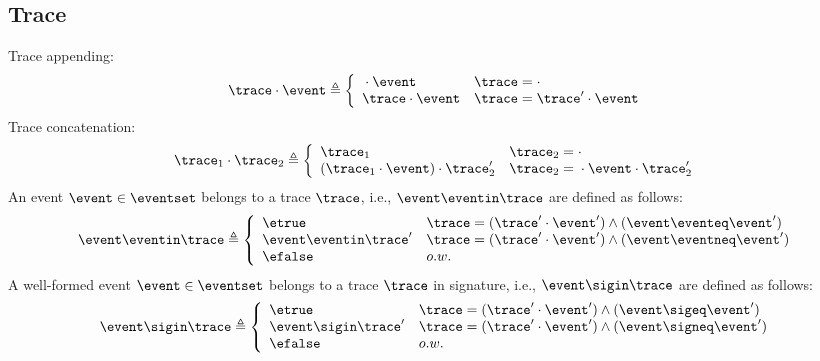 %
\subsection{Trace}
Trace appending:
\[
  \trace \cdot \event \triangleq
  \left\{
  \begin{array}{ll} 
    {} \cdot \event           & \trace =  \cdot \\
    \trace \cdot \event    & \trace =  \trace' \cdot \event\\ 
  \end{array}
  \right.
\]
%
Trace concatenation:
\[
  \trace_1 \cdot \trace_2 \triangleq
  \left\{
  \begin{array}{ll} 
    \trace_1                                  & \trace_2 =  \cdot \\
    (\trace_1 \cdot \event) \cdot \trace_2'    & \trace_2 =  {} \cdot \event \cdot \trace_2'\\ 
  \end{array}
  \right.
\]
%
An event $\event \in \eventset$ belongs to a trace $\trace$, i.e., $\event \eventin \trace$ are defined as follows:
%
\begin{equation}
  \event \eventin \trace  
  \triangleq \left\{
  \begin{array}{ll} 
    \etrue                  & \trace =  (\trace' \cdot \event') \land (\event \eventeq \event') \\
    \event \eventin \trace' & \trace =  (\trace' \cdot \event') \land (\event \eventneq \event') \\ 
    \efalse                 & o.w.
  \end{array}
  \right.
\end{equation}
%
A well-formed event $\event \in \eventset$ belongs to a trace $\trace$ in signature, 
i.e., $\event \sigin \trace$ are defined as follows:
\begin{equation}
  \event \sigin \trace  
  \triangleq \left\{
  \begin{array}{ll} 
    \etrue                  & \trace =  (\trace' \cdot \event') \land (\event \sigeq \event') \\
    \event \sigin \trace'   & \trace =  (\trace' \cdot \event') \land (\event \signeq \event') \\ 
    \efalse                 & o.w.
  \end{array}
  \right.
\end{equation}
%
%
%
